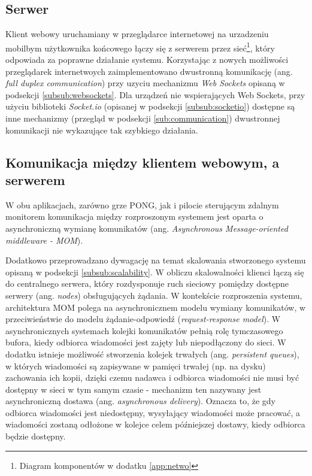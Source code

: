 \subsection{Serwer}

Klient webowy uruchamiany w przeglądarce internetowej na urzadzeniu mobilbym użytkownika końcowego łączy się z serwerem przez sieć\footnote{Diagram komponentów w dodatku \ref{app:netwo}}, który odpowiada za poprawne działanie systemu. Korzystając z nowych możliwości przeglądarek internetwoych zaimplementowano dwustronną komunikację (ang. \emph{full duplex communication}) przy uzyciu mechanizmu \emph{Web Sockets}\cite{websockets-rfc} opisaną w podsekcji \ref{subsub:websockets}. Dla urządzeń nie wspierających Web Sockets, przy użyciu biblioteki \emph{Socket.io} (opisanej w podsekcji \ref{subsub:socketio}) dostępne są inne mechanizmy (przegląd w podsekcji \ref{sub:communication}) dwustronnej komunikacji nie wykazujące tak szybkiego działania.

\subsection{Komunikacja między klientem webowym, a serwerem}

W obu aplikacjach, zarówno grze PONG, jak i pilocie sterującym zdalnym monitorem komunikacja między rozproszonym systemem jest oparta o asynchroniczną wymianę komunikatów (ang. \emph{Asynchronous Message-oriented middleware - MOM})\cite{message-oriented-middleware}.

Dodatkowo przeprowadzano dywagację na temat skalowania stworzonego systemu opisaną w podsekcji \ref{subsub:scalability}. W obliczu skalowalności klienci łączą się do centralnego serwera, który rozdysponuje ruch sieciowy pomiędzy dostępne serwery (ang. \emph{nodes}) obsługujących żądania. W kontekście rozproszenia systemu, architektura MOM polega na asynchronicznem modelu wymiany komunikatów, w przeciwieństwie do modelu żądanie-odpowiedź (\emph{request-response model}). W asynchronicznych systemach kolejki komunikatów pełnią rolę tymczasowego bufora, kiedy odbiorca wiadomości jest zajęty lub niepodłączony do sieci. W dodatku istnieje możliwość stworzenia kolejek trwałych (ang. \emph{persistent queues}), w których wiadomości są zapisywane w pamięci trwałej (np. na dysku) zachowania ich kopii, dzięki czemu nadawca i odbiorca wiadomości nie musi być dostępny w sieci w tym samym czasie - mechanizm ten nazywany jest asynchroniczną dostawa (ang. \emph{asynchronous delivery}). Oznacza to, że gdy odbiorca wiadomości jest niedostępny, wysyłający wiadomości może pracować, a wiadomości zostaną odłożone w kolejce celem późniejszej dostawy, kiedy odbiorca będzie dostępny.

